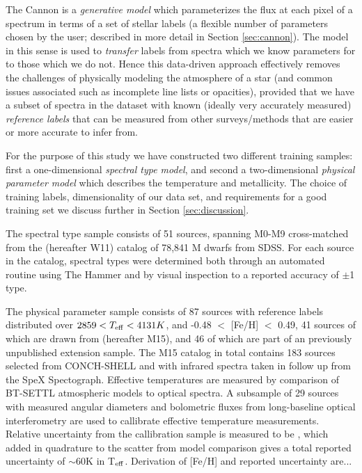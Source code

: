 \documentclass[preprint]{aastex62}
\begin{document}
The Cannon is a \emph{generative model} which parameterizes the flux at each pixel of a spectrum in terms of a set of stellar labels (a flexible number of parameters chosen by the user; described in more detail in Section \ref{sec:cannon}). The model in this sense is used to \emph{transfer} labels from spectra which we know parameters for to those which we do not. Hence this data-driven approach effectively removes the challenges of physically modeling the atmosphere of a star (and common issues associated such as incomplete line lists or opacities), provided that we have a subset of spectra in the dataset with known (ideally very accurately measured) \emph{reference labels} that can be measured from other surveys/methods that are easier or more accurate to infer from. 

For the purpose of this study we have constructed two different training samples: first a one-dimensional \emph{spectral type model}, and second a two-dimensional \emph{physical parameter model} which describes the temperature and metallicity. The choice of training labels, dimensionality of our data set, and requirements for a good training set we discuss further in Section \ref{sec:discussion}.

The spectral type sample consists of 51 sources, spanning M0-M9 cross-matched from the \citealt{West:2011} (hereafter W11) catalog of 78,841 M dwarfs from SDSS. For each source in the catalog, spectral types were determined both through an automated routine using The Hammer \citep{Covey:2007} and by visual inspection to a reported accuracy of $\pm$1 type.

The physical parameter sample consists of 87 sources with reference labels distributed over $2859 < T_{\rm eff} < 4131K$, and -0.48 $<$ [Fe/H] $<$ 0.49, 41 sources of which are drawn from \citealt{Mann:2015} (hereafter M15), and 46 of which are part of an previously unpublished extension sample. The M15 catalog in total contains 183 sources selected from CONCH-SHELL \citep{Gaidos:2013} and with infrared spectra taken in follow up from the SpeX Spectograph. Effective temperatures are measured by comparison of BT-SETTL atmospheric models \citep{Allard:2011} to optical spectra. A subsample of 29 sources with measured angular diameters and bolometric fluxes from long-baseline optical interferometry are used to callibrate effective temperature measurements. Relative uncertainty from the callibration sample is measured to be \color{red}{$\sim$30K (check this)}\color{black}, which added in quadrature to the scatter from model comparison gives a total reported uncertainty of $\sim$60K in T$_{\rm eff}$. Derivation of [Fe/H] and reported uncertainty are...
\end{document}
